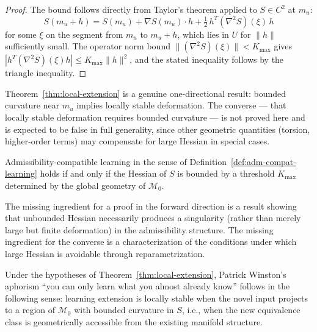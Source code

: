 \documentclass[12pt, a4paper, oneside]{book}
\newcommand{\M}{\mathcal{M}}
\newcommand{\Ent}{S}
\begin{document}
\begin{proof}
The bound follows directly from Taylor's theorem applied to $\Ent \in C^2$
at $m_u$:
\[
  \Ent(m_u + h)
  = \Ent(m_u)
  + \nabla \Ent(m_u) \cdot h
  + \tfrac{1}{2}\, h^T (\nabla^2 \Ent)(\xi)\, h
\]
for some $\xi$ on the segment from $m_u$ to $m_u + h$, which lies in $U$
for $\|h\|$ sufficiently small. The operator norm bound
$\|(\nabla^2 \Ent)(\xi)\| < K_{\max}$ gives
$|h^T (\nabla^2 \Ent)(\xi) h| \leq K_{\max}\|h\|^2$,
and the stated inequality follows by the triangle inequality.
\end{proof}

\begin{remark}
Theorem~\ref{thm:local-extension} is a genuine one-directional result:
bounded curvature near $m_u$ implies locally stable deformation. The
converse --- that locally stable deformation requires bounded curvature
--- is not proved here and is expected to be false in full generality,
since other geometric quantities (torsion, higher-order terms) may
compensate for large Hessian in special cases.
\end{remark}

\begin{conjecture}
\label{conj:curvature}
Admissibility-compatible learning in the sense of
Definition~\ref{def:adm-compat-learning} holds if and only if the
Hessian of $\Ent$ is bounded by a threshold $K_{\max}$ determined by
the global geometry of $\M_0$.

The missing ingredient for a proof in the forward direction is a result
showing that unbounded Hessian necessarily produces a singularity (rather
than merely large but finite deformation) in the admissibility structure.
The missing ingredient for the converse is a characterization of the
conditions under which large Hessian is avoidable through reparametrization.
\end{conjecture}

\begin{corollary}
\label{cor:winston}
Under the hypotheses of Theorem~\ref{thm:local-extension}, Patrick
Winston's aphorism ``you can only learn what you almost already know''
follows in the following sense: learning extension is locally stable when
the novel input projects to a region of $\M_0$ with bounded curvature
in $\Ent$, i.e., when the new equivalence class is geometrically
accessible from the existing manifold structure.
\end{corollary}
\end{document}
